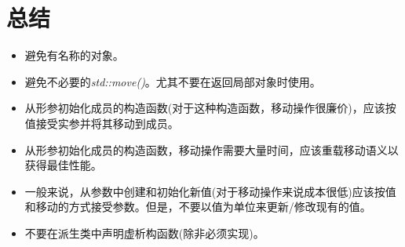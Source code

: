 \section{总结}
\begin{itemize}
	\item 避免有名称的对象。
	\item 避免不必要的\textit{std::move()}。尤其不要在返回局部对象时使用。
	\item 从形参初始化成员的构造函数(对于这种构造函数，移动操作很廉价)，应该按值接受实参并将其移动到成员。
	\item 从形参初始化成员的构造函数，移动操作需要大量时间，应该重载移动语义以获得最佳性能。
	\item 一般来说，从参数中创建和初始化新值(对于移动操作来说成本很低)应该按值和移动的方式接受参数。但是，不要以值为单位来更新/修改现有的值。
	\item 不要在派生类中声明虚析构函数(除非必须实现)。
\end{itemize}



